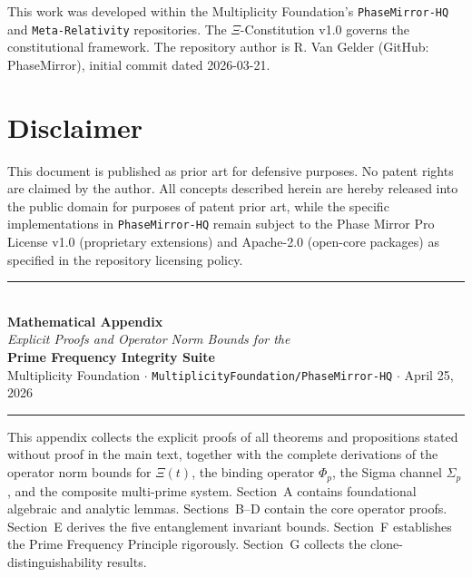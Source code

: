 \documentclass[12pt,letterpaper]{article}
\theoremstyle{definition}
\theoremstyle{remark}
\begin{document}
This work was developed within the Multiplicity Foundation's \texttt{PhaseMirror-HQ} and \texttt{Meta-Relativity} repositories. The $\Xi$-Constitution v1.0 governs the constitutional framework. The repository author is R. Van Gelder (GitHub: PhaseMirror), initial commit dated 2026-03-21.

\section*{Disclaimer}

This document is published as prior art for defensive purposes. No patent rights are claimed by the author. All concepts described herein are hereby released into the public domain for purposes of patent prior art, while the specific implementations in \texttt{PhaseMirror-HQ} remain subject to the Phase Mirror Pro License v1.0 (proprietary extensions) and Apache-2.0 (open-core packages) as specified in the repository licensing policy.

\appendix
\begin{center}
  {\color{primeviolet}\rule{\linewidth}{1.5pt}}\\[0.6em]
  {\LARGE\bfseries Mathematical Appendix}\\[0.4em]
  {\large\itshape Explicit Proofs and Operator Norm Bounds for the}\\[0.2em]
  {\large\bfseries Prime Frequency Integrity Suite}\\[0.4em]
  {\normalsize Multiplicity Foundation \quad$\cdot$\quad
    \texttt{MultiplicityFoundation/PhaseMirror-HQ} \quad$\cdot$\quad
    April 25, 2026}\\[0.6em]
  {\color{primeviolet}\rule{\linewidth}{1.5pt}}
\end{center}

\vspace{0.4em}
\begin{tcolorbox}[colback=invariantbg,colframe=primeviolet,
  title={\bfseries Scope and Organization of this Appendix}]
This appendix collects the explicit proofs of all theorems and propositions
stated without proof in the main text, together with the complete derivations
of the operator norm bounds for $\Xi(t)$, the binding operator $\Phi_p$,
the Sigma channel $\Sigma_p$, and the composite multi-prime system.
Section~A contains foundational algebraic and analytic lemmas.
Sections~B--D contain the core operator proofs.
Section~E derives the five entanglement invariant bounds.
Section~F establishes the Prime Frequency Principle rigorously.
Section~G collects the clone-distinguishability results.
\end{tcolorbox}
\end{document}
